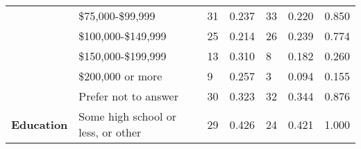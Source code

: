 \begin{tabular}{L{3cm} L{5cm} C{1.5cm} C{2.5cm} C{1.5cm} C{2.5cm} C{3cm}}
                                                          &                    \$75,000-\$99,999                     &                            31                            &                          0.237                           &                            33                            &                          0.220                           &                          0.850                            \\
                                                          &                   \$100,000-\$149,999                    &                            25                            &                          0.214                           &                            26                            &                          0.239                           &                          0.774                            \\
                                                          &                   \$150,000-\$199,999                    &                            13                            &                          0.310                           &                            8                             &                          0.182                           &                          0.260                            \\
                                                          &                    \$200,000 or more                     &                            9                             &                          0.257                           &                            3                             &                          0.094                           &                          0.155                            \\
                                                          &                   Prefer not to answer                   &                            30                            &                          0.323                           &                            32                            &                          0.344                           &                          0.876                            \\
\textbf{Education}                                        &            Some high school or less, or other            &                            29                            &                          0.426                           &                            24                            &                          0.421                           &                          1.000                            \\

\end{tabular}
